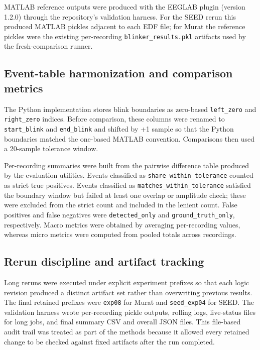 MATLAB reference outputs were produced with the EEGLAB \blinker{} plugin (version 1.2.0) through the repository's validation harness. For the SEED rerun this produced MATLAB pickles adjacent to each EDF file; for Murat the reference pickles were the existing per-recording \texttt{blinker\_results.pkl} artifacts used by the fresh-comparison runner.

\subsection{Event-table harmonization and comparison metrics}

The Python implementation stores blink boundaries as zero-based \texttt{left\_zero} and \texttt{right\_zero} indices. Before comparison, these columns were renamed to \texttt{start\_blink} and \texttt{end\_blink} and shifted by +1 sample so that the Python boundaries matched the one-based MATLAB convention. Comparisons then used a \num{20}-sample tolerance window.

Per-recording summaries were built from the pairwise difference table produced by the evaluation utilities. Events classified as \texttt{share\_within\_tolerance} counted as strict true positives. Events classified as \texttt{matches\_within\_tolerance} satisfied the boundary window but failed at least one overlap or amplitude check; these were excluded from the strict count and included in the lenient count. False positives and false negatives were \texttt{detected\_only} and \texttt{ground\_truth\_only}, respectively. Macro metrics were obtained by averaging per-recording values, whereas micro metrics were computed from pooled totals across recordings.

\subsection{Rerun discipline and artifact tracking}

Long reruns were executed under explicit experiment prefixes so that each logic revision produced a distinct artifact set rather than overwriting previous results. The final retained prefixes were \texttt{exp08} for Murat and \texttt{seed\_exp04} for SEED. The validation harness wrote per-recording pickle outputs, rolling logs, live-status files for long jobs, and final summary CSV and overall JSON files. This file-based audit trail was treated as part of the methods because it allowed every retained change to be checked against fixed artifacts after the run completed.
